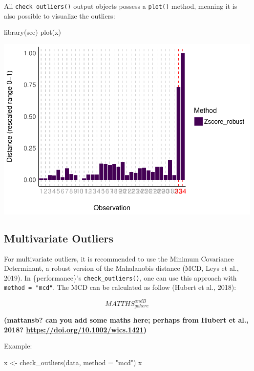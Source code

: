 \documentclass[
]{article}
\newenvironment{Shaded}{\begin{snugshade}}{\end{snugshade}}
\newcommand{\AttributeTok}[1]{\textcolor[rgb]{0.77,0.63,0.00}{#1}}
\newcommand{\FunctionTok}[1]{\textcolor[rgb]{0.00,0.00,0.00}{#1}}
\newcommand{\NormalTok}[1]{#1}
\newcommand{\OtherTok}[1]{\textcolor[rgb]{0.56,0.35,0.01}{#1}}
\newcommand{\StringTok}[1]{\textcolor[rgb]{0.31,0.60,0.02}{#1}}
\begin{document}
All \texttt{check\_outliers()} output objects possess a \texttt{plot()}
method, meaning it is also possible to visualize the outliers:

\begin{Shaded}
\begin{Highlighting}[]
\FunctionTok{library}\NormalTok{(see)}
\FunctionTok{plot}\NormalTok{(x)}
\end{Highlighting}
\end{Shaded}

\includegraphics[width=1\linewidth]{paper_files/figure-latex/univariate plot-1}

\hypertarget{multivariate-outliers}{%
\subsection{Multivariate Outliers}\label{multivariate-outliers}}

For multivariate outliers, it is recommended to use the Minimum
Covariance Determinant, a robust version of the Mahalanobis distance
(MCD, Leys et al., 2019). In \{performance\}'s
\texttt{check\_outliers()}, one can use this approach with
\texttt{method\ =\ "mcd"}. The MCD can be calculated as follow (Hubert
et al., 2018):

\[
MATTHS_{gohere}^{andB}
\]

\textbf{(\textbf{mattansb?} can you add some maths here; perhaps from
Hubert et al., 2018? \url{https://doi.org/10.1002/wics.1421})}

Example:

\begin{Shaded}
\begin{Highlighting}[]
\NormalTok{x }\OtherTok{\textless{}{-}} \FunctionTok{check\_outliers}\NormalTok{(data, }\AttributeTok{method =} \StringTok{"mcd"}\NormalTok{)}
\NormalTok{x}
\end{Highlighting}
\end{Shaded}
\end{document}
